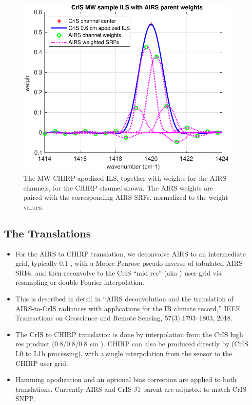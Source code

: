 \documentclass[12pt]{article}
\begin{document}
\begin{figure} %
\centering
\includegraphics[width=\textwidth]{figures/sample_CrIS_ILS_with_AIRS_parent_SRFs.pdf}
\caption{The MW CHIRP apodized ILS, together with weights for the
  AIRS channels, for the CHIRP channel shown.  The AIRS weights are
  paired with the corresponding AIRS SRFs, normalized to the weight
  values.}
\label{figC}
\end{figure}

\subsection{The Translations}

\begin{itemize}

  \item For the AIRS to CHIRP translation, we deconvolve
    AIRS to an intermediate grid, typically $0.1$ {\wn}, with a
    Moore-Penrose pseudo-inverse of tabulated AIRS SRFs, and then
    reconvolve to the CrIS ``mid res'' (aka \chirp) user grid via
    resampling or double Fourier interpolation.

  \item This is described in detail in ``AIRS deconvolution and
    the translation of AIRS-to-CrIS radiances with applications
    for the IR climate record,'' IEEE Transactions on Geoscience and
    Remote Sensing, 57(3):1793--1803, 2018.

  \item The CrIS to CHIRP translation is done by interpolation
    from the CrIS high res product (0.8/0.8/0.8 cm \opd).  CHIRP
    can also be produced directly by {\umbc} {\ccast} (CrIS L0 to
    L1b processing), with a single interpolation from the sensor to
    the CHIRP user grid.

  \item Hamming apodization and an optional bias correction are
    applied to both translations.  Currently AIRS and CrIS J1
    parent are adjusted to match CrIS SNPP.

\end{itemize}
\end{document}
